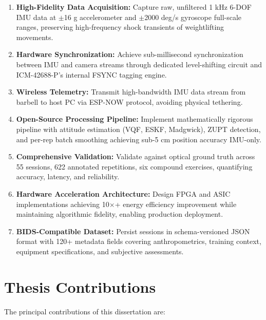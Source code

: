\begin{enumerate}
    \item \textbf{High-Fidelity Data Acquisition:} Capture raw, unfiltered 1 kHz 6-DOF IMU data at $\pm$16 g accelerometer and $\pm$2000 deg/s gyroscope full-scale ranges, preserving high-frequency shock transients of weightlifting movements.

    \item \textbf{Hardware Synchronization:} Achieve sub-millisecond synchronization between IMU and camera streams through dedicated level-shifting circuit and ICM-42688-P's internal FSYNC tagging engine.

    \item \textbf{Wireless Telemetry:} Transmit high-bandwidth IMU data stream from barbell to host PC via ESP-NOW protocol, avoiding physical tethering.

    \item \textbf{Open-Source Processing Pipeline:} Implement mathematically rigorous pipeline with attitude estimation (VQF, ESKF, Madgwick), ZUPT detection, and per-rep batch smoothing achieving sub-5 cm position accuracy IMU-only.

    \item \textbf{Comprehensive Validation:} Validate against optical ground truth across 55 sessions, 622 annotated repetitions, six compound exercises, quantifying accuracy, latency, and reliability.

    \item \textbf{Hardware Acceleration Architecture:} Design FPGA and ASIC implementations achieving 10$\times$+ energy efficiency improvement while maintaining algorithmic fidelity, enabling production deployment.

    \item \textbf{BIDS-Compatible Dataset:} Persist sessions in schema-versioned JSON format with 120+ metadata fields covering anthropometrics, training context, equipment specifications, and subjective assessments.
\end{enumerate}

\section{Thesis Contributions}

The principal contributions of this dissertation are:

